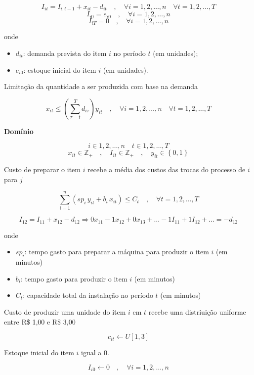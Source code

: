 \documentclass[12pt]{scrartcl}
\begin{document}
\[ I_{it} = I_{i, t-1} + x_{it} - d_{it} \quad , \quad \forall i = {1, 2, \dots, n} \quad \forall t = {1, 2, \dots, T} \]
\[ I_{i0} = e_{i0} \quad , \quad \forall i = {1, 2, \dots, n} \]
\[ I_{iT} = 0 \quad , \quad \forall i = {1, 2, \dots, n} \]

onde

\begin{itemize}
    \item $d_{it}$: demanda prevista do item $i$ no período $t$ (em unidades);
    \item $e_{i0}$: estoque inicial do item $i$ (em unidades).
  \end{itemize}

Limitação da quantidade a ser produzida com base na demanda 

\[ x_{it} \leq \left(\sum_{\tau = t}^{T} d_{i\tau}\right) y_{it} \quad , \quad \forall i = {1, 2, \dots, n} \quad \forall t = {1, 2, \dots, T} \]

\textbf{Domínio}

\[ i \in {1, 2, \dots, n} \quad t \in {1, 2, \dots, T} \]
\[ x_{it} \in \mathbb{Z}_+ \quad , \quad I_{it} \in \mathbb{Z}_+ \quad , \quad y_{it} \in \left\{0, 1\right\} \]

\newpage

\LARGE

Custo de preparar o item $i$ recebe a média dos custos das trocas do processo de $i$ para $j$

\[ \sum_{i = 1}^{n} \left(sp_i \, y_{it} + b_i \, x_{it}\right) \leq C_t \quad , \quad \forall t = {1, 2, \dots, T} \]

\Large

\[ I_{12} = I_{11} + x_{12} - d_{12} \Longrightarrow 0x_{11} - 1x_{12} + 0x_{13} + \dots - 1 I_{11} + 1 I_{12} + \dots = - d_{12} \]



onde

\begin{itemize}
  \item $sp_i$: tempo gasto para preparar a máquina para produzir o item $i$ (em minutos)
  \item $b_i$: tempo gasto para produzir o item $i$ (em minutos)
  \item $C_t$: capacidade total da instalação no período $t$ (em minutos)
  \end{itemize}

Custo de produzir uma unidade do item $i$ em $t$ recebe uma distriuição uniforme entre R\$ 1,00 e R\$ 3,00 

\[ c_{it} \leftarrow U [1, 3] \]

Estoque inicial do item $i$ igual a $0$.

\[ I_{i0} \leftarrow 0 \quad , \quad \forall i = {1, 2, \dots, n} \]
\end{document}
